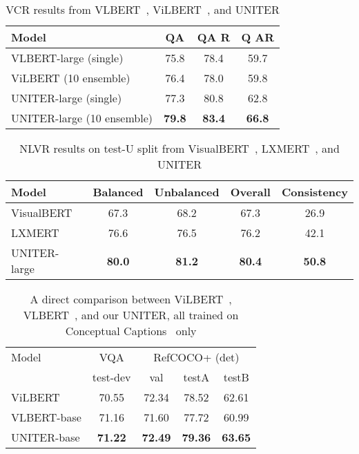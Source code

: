 \documentclass[runningheads]{llncs}
\begin{document}
\begin{table}[!t]
    \centering
\begin{tabular}{l |c c c}
        \hline
          Model & QA & QA R & Q  AR \\
         \hline
          VLBERT-large (single) & 75.8 & 78.4 & 59.7 \\
          ViLBERT (10 ensemble) & 76.4 & 78.0 & 59.8 \\
          UNITER-large (single) & 77.3 & 80.8 & 62.8 \\
          UNITER-large (10 ensemble) & \textbf{79.8} & \textbf{83.4} & \textbf{66.8} \\
         \hline
    \end{tabular}
    \caption{\small{VCR results from VLBERT~\cite{su2019vl}, ViLBERT~\cite{lu2019vilbert}, and UNITER}}
    \label{tab:vcr+}
\vspace{-10pt}
\end{table}

\begin{table}[!t]
    \centering
\begin{tabular}{l | c c c c}
        \hline
         Model & Balanced & Unbalanced & Overall & Consistency\\
         \hline
         VisualBERT & 67.3 & 68.2 & 67.3 & 26.9\\
         LXMERT & 76.6 & 76.5 & 76.2 & 42.1\\
         UNITER-large & \textbf{80.0} & \textbf{81.2} & \textbf{80.4}  & \textbf{50.8}\\
         \hline
    \end{tabular}
\caption{\small{NLVR results on test-U split from VisualBERT~\cite{li2019visualbert}, LXMERT~\cite{tan2019lxmert}, and UNITER}}
\label{tab:nlvr+}
\vspace{-10pt}
\end{table}

 

\begin{table*}[t!]
\centering
\small
\begin{tabular}{l c  c c c  }
\hline
Model & VQA & \multicolumn{3}{c}{RefCOCO+ (det)} \\
\cmidrule(lr){2-2} \cmidrule(lr){3-5} 
& test-dev & val & testA & testB \\
\hline
ViLBERT & 70.55 & 72.34 & 78.52 & 62.61  \\
VLBERT-base & 71.16 &  71.60 & 77.72 & 60.99  \\
UNITER-base & \textbf{71.22} & \textbf{72.49} & \textbf{79.36} & \textbf{63.65} \\
\hline
\end{tabular}
\caption{\small{A direct comparison between ViLBERT~\cite{lu2019vilbert}, VLBERT~\cite{su2019vl}, and our UNITER, all trained on Conceptual Captions~\cite{sharma2018conceptual} only}}
\label{tab:cc_results}
\vspace{-20pt}
\end{table*} 
\end{document}
